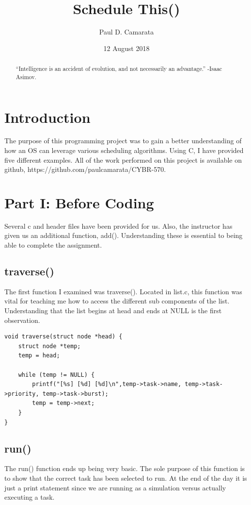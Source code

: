 \documentclass[10pt]{article}
\begin{document}
\title{Schedule This()}
\author{Paul D. Camarata}
\date{12 August 2018}

\maketitle
\pagebreak
\begin{abstract}
“Intelligence is an accident of evolution, and not necessarily an advantage.”
-Isaac Asimov.
\end{abstract}

\section{Introduction}
The purpose of this programming project was to gain a better understanding of how an OS can leverage various scheduling algorithms.  Using C, I have provided five different examples.  All of the work performed on this project is available on github, https://github.com/paulcamarata/CYBR-570.

\section{Part I: Before Coding}
Several c and header files have been provided for us.  Also, the instructor has given us an additional function, add().  Understanding these is essential to being able to complete the assignment.  

\subsection{traverse()}
The first function I examined was traverse().  Located in list.c, this function was vital for teaching me how to access the different sub components of the list.  Understanding that the list begins at head and ends at NULL is the first observation.  

\begin{verbatim}
void traverse(struct node *head) {
    struct node *temp;
    temp = head;

    while (temp != NULL) {
        printf("[%s] [%d] [%d]\n",temp->task->name, temp->task->priority, temp->task->burst);
        temp = temp->next;
    }
}
\end{verbatim}

\subsection{run()}
The run() function ends up being very basic.  The sole purpose of this function is to show that the correct task has been selected to run.  At the end of the day it is just a print statement since we are running as a simulation versus actually executing a task.
\end{document}
